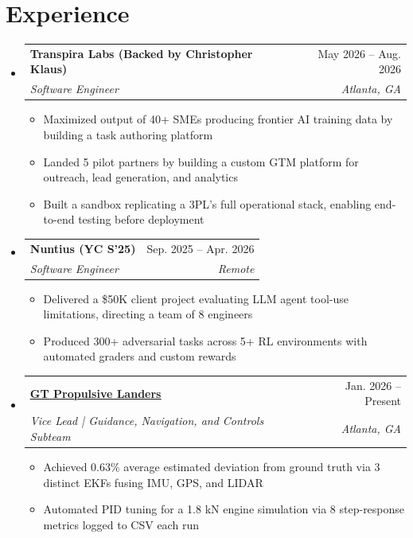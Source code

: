 \documentclass[letterpaper,11pt]{article}
\makeatletter
\newcommand{\resumeItem}[1]{
  \item[--]\small{
    {#1 \vspace{-2pt}}
  }
}
\newcommand{\resumeSubheading}[4]{
  \vspace{-2pt}\item
    \begin{tabular*}{0.97\textwidth}[t]{l@{\extracolsep{\fill}}r}
      \textbf{#1} & #2 \\
      \textit{\small#3} & \textit{\small #4} \\
    \end{tabular*}\vspace{-7pt}
}
\newcommand{\resumeSubHeadingListStart}{\begin{itemize}[leftmargin=0.15in, label={}]}
\newcommand{\resumeSubHeadingListEnd}{\end{itemize}}
\newcommand{\resumeItemListStart}{\begin{itemize}}
\newcommand{\resumeItemListEnd}{\end{itemize}\vspace{-5pt}}
\makeatother
\begin{document}
\section{Experience}
  \resumeSubHeadingListStart
  \resumeSubheading
      {Transpira Labs (Backed by Christopher Klaus)}{May 2026 -- Aug. 2026}
      {Software Engineer}{Atlanta, GA}
      \resumeItemListStart
        \resumeItem{Maximized output of 40+ SMEs producing frontier AI training data by building a task authoring platform}
        \resumeItem{Landed 5 pilot partners by building a custom GTM platform for outreach, lead generation, and analytics}
        \resumeItem{Built a sandbox replicating a 3PL's full operational stack, enabling end-to-end testing before  deployment}
    \resumeItemListEnd
    \resumeSubheading
      {Nuntius (YC S'25)}{Sep. 2025 -- Apr. 2026}
      {Software Engineer}{Remote}
      \resumeItemListStart
        \resumeItem{Delivered a \$50K client project evaluating LLM agent tool-use limitations, directing a team of 8 engineers}
        \resumeItem{Produced 300+ adversarial tasks across 5+ RL environments with automated graders and custom rewards}
    \resumeItemListEnd

    \resumeSubheading
      {\href{https://github.com/Propulsive-Landers-GT}{\underline{GT Propulsive Landers}}}{Jan. 2026 -- Present}
      {Vice Lead | Guidance, Navigation, and Controls Subteam}{Atlanta, GA}
      \resumeItemListStart
        \resumeItem{Achieved 0.63\% average estimated deviation from ground truth via 3 distinct EKFs fusing IMU, GPS, and LIDAR}
        \resumeItem{Automated PID tuning for a 1.8 kN engine simulation via 8 step-response metrics logged to CSV each run}
      \resumeItemListEnd

  \resumeSubHeadingListEnd

\end{document}
